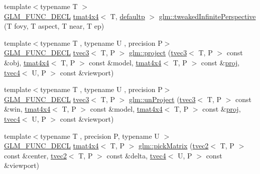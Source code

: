\begin{DoxyCompactItemize}
\item 
{\footnotesize template$<$typename T $>$ }\\\mbox{\hyperlink{setup_8hpp_ab2d052de21a70539923e9bcbf6e83a51}{G\+L\+M\+\_\+\+F\+U\+N\+C\+\_\+\+D\+E\+CL}} \mbox{\hyperlink{structglm_1_1tmat4x4}{tmat4x4}}$<$ T, \mbox{\hyperlink{namespaceglm_a0f04f086094c747d227af4425893f545a9d21ccd8b5a009ec7eb7677befc3bf51}{defaultp}} $>$ \mbox{\hyperlink{group__gtc__matrix__transform_gaa50fce7f50b5d5da881ed30f5532a921}{glm\+::tweaked\+Infinite\+Perspective}} (T fovy, T aspect, T near, T ep)
\item 
{\footnotesize template$<$typename T , typename U , precision P$>$ }\\\mbox{\hyperlink{setup_8hpp_ab2d052de21a70539923e9bcbf6e83a51}{G\+L\+M\+\_\+\+F\+U\+N\+C\+\_\+\+D\+E\+CL}} \mbox{\hyperlink{structglm_1_1tvec3}{tvec3}}$<$ T, P $>$ \mbox{\hyperlink{group__gtc__matrix__transform_gad743556abd138264d4f06f4ca27f1d7e}{glm\+::project}} (\mbox{\hyperlink{structglm_1_1tvec3}{tvec3}}$<$ T, P $>$ const \&obj, \mbox{\hyperlink{structglm_1_1tmat4x4}{tmat4x4}}$<$ T, P $>$ const \&model, \mbox{\hyperlink{structglm_1_1tmat4x4}{tmat4x4}}$<$ T, P $>$ const \&\mbox{\hyperlink{group__gtx__projection_gadf29123bcf748fc9d6fb0998192184cf}{proj}}, \mbox{\hyperlink{structglm_1_1tvec4}{tvec4}}$<$ U, P $>$ const \&viewport)
\item 
{\footnotesize template$<$typename T , typename U , precision P$>$ }\\\mbox{\hyperlink{setup_8hpp_ab2d052de21a70539923e9bcbf6e83a51}{G\+L\+M\+\_\+\+F\+U\+N\+C\+\_\+\+D\+E\+CL}} \mbox{\hyperlink{structglm_1_1tvec3}{tvec3}}$<$ T, P $>$ \mbox{\hyperlink{group__gtc__matrix__transform_ga82a558de3ce42cbeed0f6ec292a4e1b3}{glm\+::un\+Project}} (\mbox{\hyperlink{structglm_1_1tvec3}{tvec3}}$<$ T, P $>$ const \&win, \mbox{\hyperlink{structglm_1_1tmat4x4}{tmat4x4}}$<$ T, P $>$ const \&model, \mbox{\hyperlink{structglm_1_1tmat4x4}{tmat4x4}}$<$ T, P $>$ const \&\mbox{\hyperlink{group__gtx__projection_gadf29123bcf748fc9d6fb0998192184cf}{proj}}, \mbox{\hyperlink{structglm_1_1tvec4}{tvec4}}$<$ U, P $>$ const \&viewport)
\item 
{\footnotesize template$<$typename T , precision P, typename U $>$ }\\\mbox{\hyperlink{setup_8hpp_ab2d052de21a70539923e9bcbf6e83a51}{G\+L\+M\+\_\+\+F\+U\+N\+C\+\_\+\+D\+E\+CL}} \mbox{\hyperlink{structglm_1_1tmat4x4}{tmat4x4}}$<$ T, P $>$ \mbox{\hyperlink{group__gtc__matrix__transform_ga9026c77505b99990f68826f27c267dc5}{glm\+::pick\+Matrix}} (\mbox{\hyperlink{structglm_1_1tvec2}{tvec2}}$<$ T, P $>$ const \&center, \mbox{\hyperlink{structglm_1_1tvec2}{tvec2}}$<$ T, P $>$ const \&delta, \mbox{\hyperlink{structglm_1_1tvec4}{tvec4}}$<$ U, P $>$ const \&viewport)

\end{DoxyCompactItemize}

